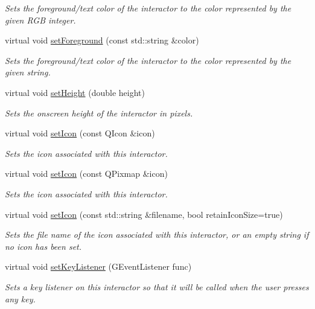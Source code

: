 \begin{DoxyCompactItemize}
\begin{DoxyCompactList}\small\item\em Sets the foreground/text color of the interactor to the color represented by the given R\+GB integer. \end{DoxyCompactList}\item 
virtual void \mbox{\hyperlink{classGInteractor_af59209aeadea6dfc6d97a2d8531f50e1}{set\+Foreground}} (const std\+::string \&color)
\begin{DoxyCompactList}\small\item\em Sets the foreground/text color of the interactor to the color represented by the given string. \end{DoxyCompactList}\item 
virtual void \mbox{\hyperlink{classGInteractor_a9e280bfc4544dfaf8e4376c4e1a74357}{set\+Height}} (double height)
\begin{DoxyCompactList}\small\item\em Sets the onscreen height of the interactor in pixels. \end{DoxyCompactList}\item 
virtual void \mbox{\hyperlink{classGInteractor_a542abfcd7261751352af129c7215ecda}{set\+Icon}} (const Q\+Icon \&icon)
\begin{DoxyCompactList}\small\item\em Sets the icon associated with this interactor. \end{DoxyCompactList}\item 
virtual void \mbox{\hyperlink{classGInteractor_a368e1a338f84401c284506d03b1ba769}{set\+Icon}} (const Q\+Pixmap \&icon)
\begin{DoxyCompactList}\small\item\em Sets the icon associated with this interactor. \end{DoxyCompactList}\item 
virtual void \mbox{\hyperlink{classGInteractor_a762e139aa311461c3984d3ad28293f64}{set\+Icon}} (const std\+::string \&filename, bool retain\+Icon\+Size=true)
\begin{DoxyCompactList}\small\item\em Sets the file name of the icon associated with this interactor, or an empty string if no icon has been set. \end{DoxyCompactList}\item 
virtual void \mbox{\hyperlink{classGInteractor_aeb8324d3287fa1fbe093f4d6230cf0a6}{set\+Key\+Listener}} (G\+Event\+Listener func)
\begin{DoxyCompactList}\small\item\em Sets a key listener on this interactor so that it will be called when the user presses any key. \end{DoxyCompactList}\item 

\end{DoxyCompactItemize}
